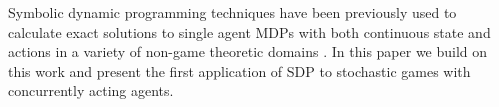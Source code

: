 Symbolic dynamic programming techniques have been previously used to
calculate exact solutions to single agent MDPs with both continuous
state and actions in a variety of non-game theoretic domains
\cite{Sanner_UAI_2011,Zamani_AAAI_2012}.  In this paper we build on
this work and present the first application of SDP to stochastic games
with concurrently acting agents.

%
